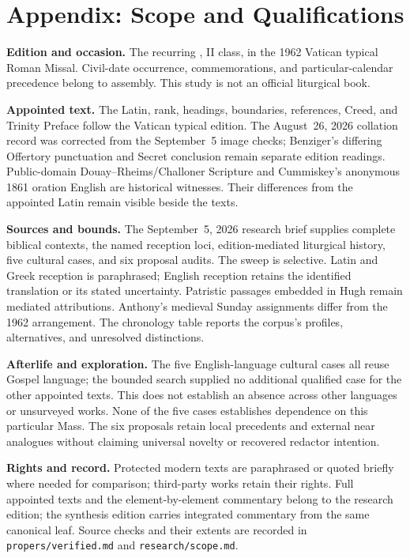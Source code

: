 \section*{Appendix: Scope and Qualifications}
\begin{studyframe}
\textbf{Edition and occasion.} The recurring , II class, in the 1962 Vatican typical Roman Missal.
Civil-date occurrence, commemorations, and particular-calendar precedence
belong to assembly. This study is not an official liturgical book.

\textbf{Appointed text.} The Latin, rank, headings, boundaries, references,
Creed, and Trinity Preface follow the Vatican typical edition. The
August~26, 2026 collation record was corrected from the September~5 image
checks; Benziger's differing Offertory punctuation and Secret conclusion
remain separate edition readings. Public-domain
Douay--Rheims/Challoner Scripture and Cummiskey's anonymous 1861 oration
English are historical witnesses. Their differences from the appointed Latin
remain visible beside the texts.

\textbf{Sources and bounds.} The September~5, 2026 research brief supplies
complete biblical contexts, the named reception loci, edition-mediated
liturgical history, five cultural cases, and six proposal audits. The sweep
is selective. Latin and Greek reception is paraphrased; English reception
retains the identified translation or its stated uncertainty. Patristic
passages embedded in Hugh remain mediated attributions. Anthony's medieval
Sunday assignments differ from the 1962 arrangement. The chronology table
reports the corpus's profiles, alternatives, and unresolved distinctions.

\textbf{Afterlife and exploration.} The five English-language cultural cases
all reuse Gospel language; the bounded search supplied no additional
qualified case for the other appointed texts. This does not establish an
absence across other languages or unsurveyed works. None of the five cases
establishes dependence on this particular Mass. The six proposals retain
local precedents and external near analogues without claiming universal
novelty or recovered redactor intention.

\textbf{Rights and record.} Protected modern texts are paraphrased or quoted
briefly where needed for comparison; third-party works retain their rights.
Full appointed texts and the element-by-element commentary belong to the
research edition; the synthesis edition carries integrated commentary from
the same canonical leaf. Source checks and their extents are recorded in
\nolinkurl{propers/verified.md} and \nolinkurl{research/scope.md}.
\end{studyframe}
\clearpage

